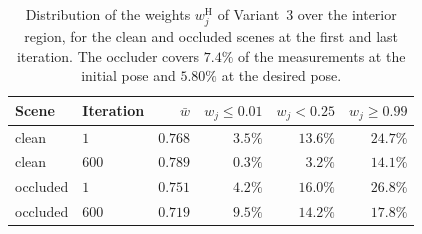 \begin{table}[H]
    \centering
    \caption{Distribution of the weights $w^{\mathrm{H}}_{j}$ of Variant~3
    over the interior region, for the clean and occluded scenes at the first
    and last iteration. The occluder covers $7.4\%$ of the measurements at the
    initial pose and $5.80\%$ at the desired pose.}
    \label{tab:weight-stats}
    \small
    \begin{tabular}{@{}llrrrr@{}}
        \toprule
        Scene & Iteration & $\bar{w}$ & $w_j\le0.01$ & $w_j<0.25$ & $w_j\ge0.99$ \\
        \midrule
        clean    & $1$   & $0.768$ & $3.5\%$ & $13.6\%$ & $24.7\%$ \\
        clean    & $600$ & $0.789$ & $0.3\%$ & $\phantom{0}3.2\%$ & $14.1\%$ \\
        occluded & $1$   & $0.751$ & $4.2\%$ & $16.0\%$ & $26.8\%$ \\
        occluded & $600$ & $0.719$ & $9.5\%$ & $14.2\%$ & $17.8\%$ \\
        \bottomrule
    \end{tabular}
\end{table}

